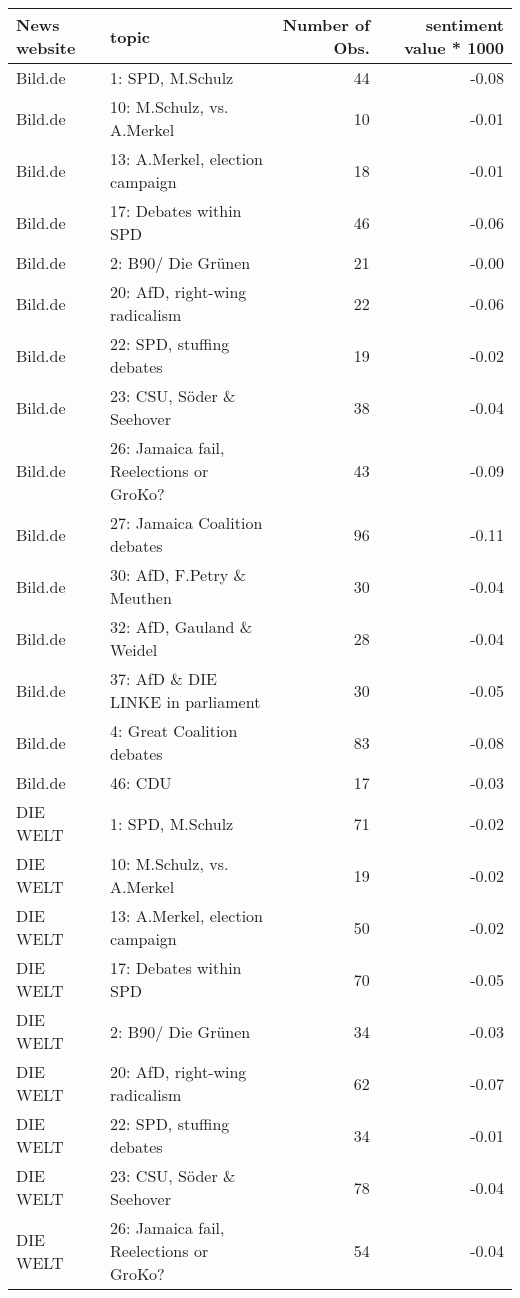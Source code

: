 \begin{adjustbox}{width=\textwidth}
\begin{tabular}{llrr}
  \hline
News website & topic & Number of Obs. & sentiment value * 1000 \\ 
  \hline
Bild.de & 1: SPD, M.Schulz &  44 & -0.08 \\ 
  Bild.de & 10: M.Schulz, vs. A.Merkel &  10 & -0.01 \\ 
  Bild.de & 13: A.Merkel, election campaign &  18 & -0.01 \\ 
  Bild.de & 17: Debates within SPD &  46 & -0.06 \\ 
  Bild.de & 2: B90/ Die Grünen &  21 & -0.00 \\ 
  Bild.de & 20: AfD, right-wing radicalism &  22 & -0.06 \\ 
  Bild.de & 22: SPD, stuffing debates &  19 & -0.02 \\ 
  Bild.de & 23: CSU, Söder \& Seehover &  38 & -0.04 \\ 
  Bild.de & 26: Jamaica fail, Reelections or GroKo? &  43 & -0.09 \\ 
  Bild.de & 27: Jamaica Coalition debates &  96 & -0.11 \\ 
  Bild.de & 30: AfD, F.Petry \& Meuthen &  30 & -0.04 \\ 
  Bild.de & 32: AfD, Gauland \& Weidel &  28 & -0.04 \\ 
  Bild.de & 37: AfD \& DIE LINKE in parliament &  30 & -0.05 \\ 
  Bild.de & 4: Great Coalition debates &  83 & -0.08 \\ 
  Bild.de & 46: CDU &  17 & -0.03 \\ 
  DIE WELT & 1: SPD, M.Schulz &  71 & -0.02 \\ 
  DIE WELT & 10: M.Schulz, vs. A.Merkel &  19 & -0.02 \\ 
  DIE WELT & 13: A.Merkel, election campaign &  50 & -0.02 \\ 
  DIE WELT & 17: Debates within SPD &  70 & -0.05 \\ 
  DIE WELT & 2: B90/ Die Grünen &  34 & -0.03 \\ 
  DIE WELT & 20: AfD, right-wing radicalism &  62 & -0.07 \\ 
  DIE WELT & 22: SPD, stuffing debates &  34 & -0.01 \\ 
  DIE WELT & 23: CSU, Söder \& Seehover &  78 & -0.04 \\ 
  DIE WELT & 26: Jamaica fail, Reelections or GroKo? &  54 & -0.04 \\ 

\end{tabular}
\end{adjustbox}
